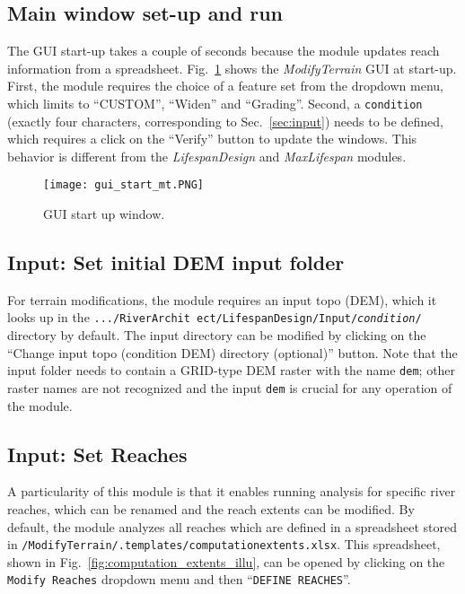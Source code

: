 \subsection{Main window set-up and run} 
The GUI start-up takes a couple of seconds because the module updates reach information from a spreadsheet. Fig.~\ref{fig:gui_start_mt} shows the \textit{ModifyTerrain} GUI at start-up. First, the module requires the choice of a feature set from the dropdown menu, which limits to ``CUSTOM'', ``Widen'' and ``Grading''. Second, a \texttt{condition} (exactly four characters, corresponding to Sec.~\ref{sec:input}) needs to be defined, which requires a click on the ``Verify'' button to update the windows. This behavior is different from the \textit{LifespanDesign} and \textit{MaxLifespan} modules.
\begin{figure}[hbt]
	\begin{center}
	\texttt{[image: gui\_start\_mt.PNG]} %
	\caption{GUI start up window. \label{fig:gui_start_mt}}
	\end{center}
\end{figure}

\subsection{Input: Set initial DEM input folder}
For terrain modifications, the module requires an input topo (DEM), which it looks up in the \texttt{.../RiverArchit ect/LifespanDesign/Input/\textit{condition}/} directory by default. The input directory can be modified by clicking on the ``Change input topo (condition DEM) directory (optional)'' button. Note that the input folder needs to contain a GRID-type DEM raster with the name \texttt{dem}; other raster names are not recognized and the input \texttt{dem} is crucial for any operation of the module.

\subsection{Input: Set Reaches} \label{sec:mtsetreaches}
A particularity of this module is that it enables running analysis for specific river reaches, which can be renamed and the reach extents can be modified. By default, the module analyzes all reaches which are defined in a spreadsheet stored in \texttt{/ModifyTerrain/.templates/computation{\myUnderscore}extents.xlsx}. This spreadsheet, shown in Fig.~\ref{fig:computation_extents_illu}, can be opened by clicking on the \texttt{Modify Reaches} dropdown menu and then ``\texttt{DEFINE REACHES}''.

